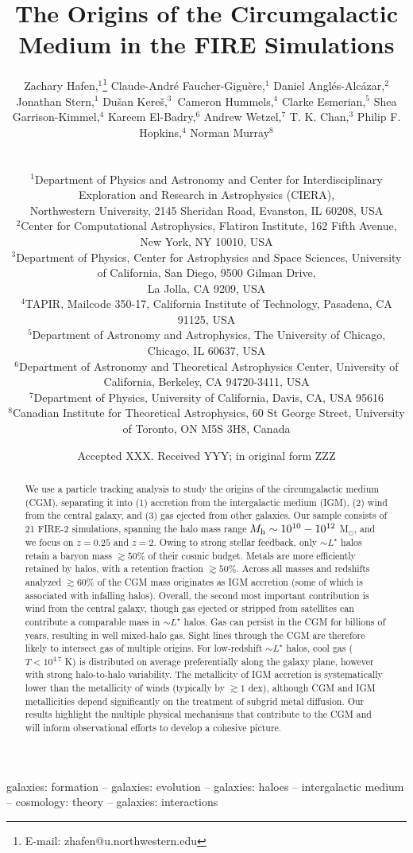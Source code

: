 \documentclass[fleqn,usenatbib]{mnras}
\title[Origins of the CGM]{The Origins of the Circumgalactic Medium in the FIRE Simulations}
\author[Hafen et al.]{
\parbox{\textwidth}{
Zachary Hafen,$^{1}$\thanks{E-mail: zhafen@u.northwestern.edu}
Claude-Andr\'e Faucher-Gigu\`ere,$^{1}$
Daniel Angl\'es-Alc\'azar,$^2$
Jonathan Stern,$^1$
Du\v{s}an Kere\v{s}$,^3$
Cameron Hummels,$^4$
Clarke Esmerian,$^5$
Shea Garrison-Kimmel,$^4$
Kareem El-Badry,$^6$
Andrew Wetzel,$^7$
T. K. Chan,$^3$
Philip F. Hopkins,$^4$
Norman Murray$^8$
} \vspace{0.4cm}\\
\parbox{\textwidth}{
$^{1}$Department of Physics and Astronomy and Center for Interdisciplinary Exploration and Research in Astrophysics (CIERA),\\ Northwestern University, 2145 Sheridan Road, Evanston, IL 60208, USA \\
$^{2}$Center for Computational Astrophysics, Flatiron Institute, 162 Fifth Avenue, New York, NY 10010, USA\\
$^3$Department of Physics, Center for Astrophysics and Space Sciences, University of California, San Diego, 9500 Gilman Drive, \\ La Jolla, CA 9209, USA \\
$^4$TAPIR, Mailcode 350-17, California Institute of Technology, Pasadena, CA 91125, USA \\
$^5$Department of Astronomy and Astrophysics, The University of Chicago, Chicago, IL 60637, USA \\
$^6$Department of Astronomy and Theoretical Astrophysics Center, University of California, Berkeley, CA 94720-3411, USA \\
$^7$Department of Physics, University of California, Davis, CA, USA 95616 \\
$^8$Canadian Institute for Theoretical Astrophysics, 60 St George Street, University of Toronto, ON M5S 3H8, Canada
}
}
\date{Accepted XXX. Received YYY; in original form ZZZ}
\begin{document}
\label{firstpage}
\pagerange{\pageref{firstpage}--\pageref{lastpage}}
\maketitle


\begin{abstract}

We use a particle tracking analysis to study the origins of the circumgalactic medium (CGM), separating it into (1) accretion from the intergalactic medium (IGM), (2) wind from the central galaxy, and (3) gas ejected from other galaxies.
Our sample consists of 21 FIRE-2 simulations, spanning the halo mass range $M_{\rm h} \sim 10^{10}-10^{12}$ M$_{\odot}$, and we focus on $z=0.25$ and $z=2$.
Owing to strong stellar feedback, only $\sim L^\star$ halos retain a baryon mass $\gtrsim50\%$ of their cosmic budget.
Metals are more efficiently retained by halos, with a retention fraction $\gtrsim50\%$.
Across all masses and redshifts analyzed $\gtrsim 60\%$ of the CGM mass originates as IGM accretion (some of which is associated with infalling halos).
Overall, the second most important contribution is wind from the central galaxy, though gas ejected or stripped from satellites can contribute a comparable mass in $\sim L^\star$ halos.
Gas can persist in the CGM for billions of years, resulting in well mixed-halo gas.
Sight lines through the CGM are therefore likely to intersect gas of multiple origins.
For low-redshift $\sim L^\star$ halos, cool gas ($T<10^{4.7}$ K) is distributed on average preferentially along the galaxy plane, however with strong halo-to-halo variability.
The metallicity of IGM accretion is systematically lower than the metallicity of winds (typically by $\gtrsim 1$ dex), although CGM and IGM metallicities depend significantly on the treatment of subgrid metal diffusion.
Our results highlight the multiple physical mechanisms that contribute to the CGM and will inform observational efforts to develop a cohesive picture.

\end{abstract}
\begin{keywords}
galaxies: formation -- galaxies: evolution -- galaxies: haloes -- intergalactic medium -- cosmology: theory -- galaxies: interactions
\end{keywords}

\end{document}
